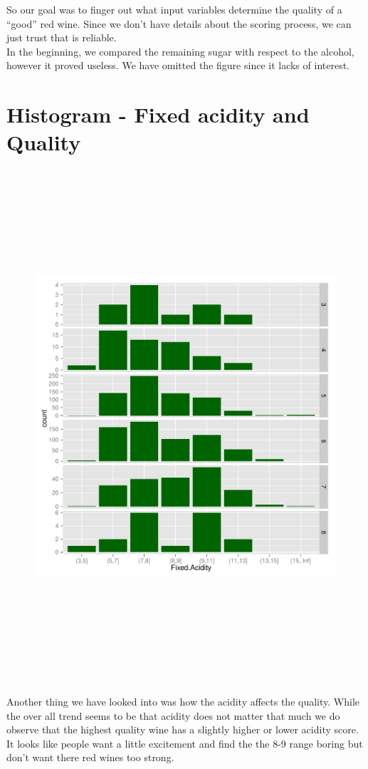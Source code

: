 \documentclass[12pt,a4paper]{article}
\begin{document}
\begin{singlespace}
So our goal was to finger out what input variables determine the quality of a ``good'' red wine. Since we don't have details about the scoring process, we can just trust that is reliable. \\

In the beginning, we compared the remaining sugar with respect to the alcohol, however it proved useless. We have omitted the figure since it lacks of interest.

\newpage
\section{Histogram - Fixed acidity and Quality}

\begin{figure}[h!]
	\hspace{-1cm}
    \centering
    \includegraphics[width=\textwidth, height=19cm, trim= 0 0 0 20]{acidVSqual.pdf}
\end{figure}
\FloatBarrier
Another thing we have looked into was how the acidity affects the quality. 
While the over all trend seems to be that acidity does not matter that much we do observe
that the highest quality wine has a slightly higher or lower acidity score. 
It looks like people want a little excitement and find the the 8-9 range boring 
but don't want there red wines too strong.


\end{singlespace}
\end{document}
